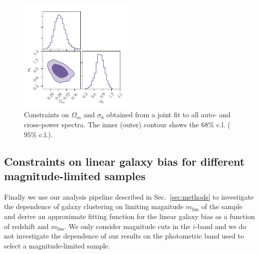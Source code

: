 \documentclass[a4paper,11pt]{article}
\begin{document}
    \begin{figure}
      \begin{center}
        \includegraphics[width=0.49\textwidth]{figures/contours-Om-s8_mPk=HOD_fix=alpha-fc-sigmaM_HOD=zevol_fit=pz-shifts+prior=0p2-pz-widths+prior=0p2_fit=auto+cross_cosmo=const-LINBIAS_HOD-param=zfid_clfit=HOD-zevol_fit=Oc+s8.pdf}
        \caption{Constraints on $\Omega_{m}$ and $\sigma_{8}$ obtained from a joint fit to all auto- and cross-power spectra. The inner (outer) contour shows the $68 \%$ c.l. ($95 \%$ c.l.).}
        \label{fig:constraints-fit=Oc+s8}
      \end{center}
    \end{figure} 

  \subsection{Constraints on linear galaxy bias for different magnitude-limited samples}\label{ssec:results.mag_cuts}
    Finally we use our analysis pipeline described in Sec.~\ref{sec:methods} to investigate the dependence of galaxy clustering on limiting magnitude $m_{\mathrm{lim}}$ of the sample and derive an approximate fitting function for the linear galaxy bias as a function of redshift and $m_{\mathrm{lim}}$. We only consider magnitude cuts in the $i$-band and we do not investigate the dependence of our results on the photometric band used to select a magnitude-limited sample.
    
\end{document}
